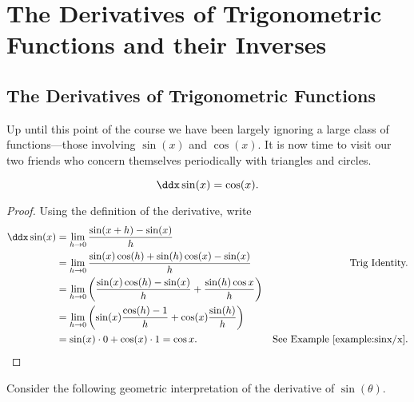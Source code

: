 \chapter{The Derivatives of Trigonometric Functions and their Inverses}



\section{The Derivatives of Trigonometric Functions}

Up until this point of the course we have been largely ignoring a large
class of functions---those involving $\sin(x)$ and $\cos(x)$. It is
now time to visit our two friends who concern themselves periodically
with triangles and circles.

\begin{theorem}\label{theorem:deriv sin}
\[
\ddx \sin(x) = \cos(x).
\]
\end{theorem}
\begin{proof}
Using the definition of the derivative, write
\begin{align*}
\ddx \sin(x) &= \lim_{h\to0} \frac{\sin(x+h)-\sin(x)}{h} \\
&= \lim_{h\to0} \frac{\sin(x)\cos(h)+\sin(h)\cos(x)-\sin(x)}{h}  & \text{Trig Identity.}\\
&= \lim_{h\to0} \left(\frac{\sin(x)\cos(h)-\sin(x)}{h} + \frac{\sin(h)\cos{x}}{h} \right)\\
&=\lim_{h\to0} \left(\sin (x)\frac{\cos(h) - 1}{h}+\cos(x)\frac{\sin(h)}{h}\right) \\
&=\sin(x) \cdot 0 + \cos(x) \cdot 1 = \cos x. & \text{See Example~\ref{example:sinx/x}.}
\end{align*}
\end{proof}

Consider the following geometric interpretation of the derivative of
$\sin(\theta)$.  

